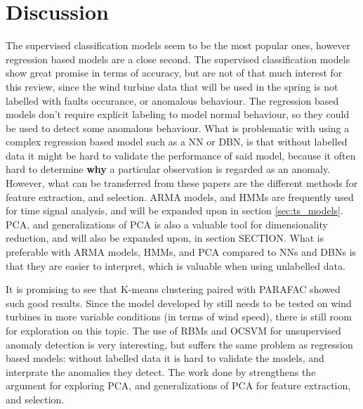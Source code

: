 \section{Discussion}
The supervised classification models seem to be the most popular ones, however regression based models are a close second. The supervised classification models show great promise in terms of accuracy, but are not of that much interest for this review, since the wind turbine data that will be used in the spring is not labelled with faults occurance, or anomalous behaviour. The regression based models don't require explicit labeling to model normal behaviour, so they could be used to detect some anomalous behaviour. What is problematic with using a complex regression based model such as a NN or DBN, is that without labelled data it might be hard to validate the performance of said model, because it often hard to determine \textbf{why} a particular observation is regarded as an anomaly. However, what can be transferred from these papers are the different methods for feature extraction, and selection. ARMA models, and HMMs are frequently used for time signal analysis, and will be expanded upon in section \ref{sec:ts_models}. PCA, and generalizations of PCA is also a valuable tool for dimensionality reduction, and will also be expanded upon, in section SECTION. What is preferable with ARMA models, HMMs, and PCA compared to NNs and DBNs is that they are easier to interpret, which is valuable when using unlabelled data. \bigskip

It is promising to see that K-means clustering paired with PARAFAC showed such good results. Since the model developed by \textcite{fault_detect_PARAFAC_k_means} still needs to be tested on wind turbines in more variable conditions (in terms of wind speed), there is still room for exploration on this topic. The use of RBMs and OCSVM for unsupervised anomaly detection is very interesting, but suffers the same problem as regression based models: without labelled data it is hard to validate the models, and interprate the anomalies they detect. The work done by \textcite{multiway_PCA_multivar_inference_cm_wt} strengthens the argument for exploring PCA, and generalizations of PCA for feature extraction, and selection.
